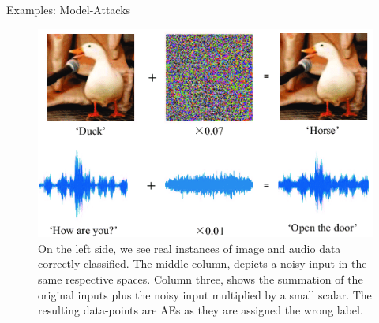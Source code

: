 \documentclass[11pt,compress,t,notes=noshow, xcolor=table]{beamer}
\begin{document}
\begin{vbframe}{Examples: Model-Attacks}
\begin{figure}[h]
\centering
  \includegraphics[width=0.6\linewidth]{figure/AEduckSound.png}
  \caption{On the left side, we see real instances of image and audio data  correctly classified. The middle column, depicts a noisy-input in the same respective spaces. Column three, shows the summation of the original inputs plus the noisy input multiplied by a small scalar. The resulting data-points are AEs as they are assigned the wrong label.}
  \label{fig:mnist}
\end{figure} 


\end{vbframe}
\end{document}
